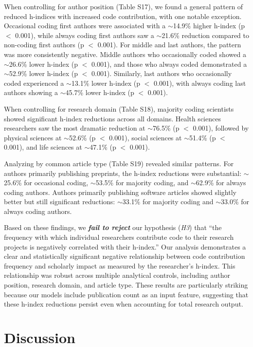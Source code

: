\documentclass[
  number,
  3p,
  onecolumn]{elsarticle}
\begin{document}
When controlling for author position (Table S17), we found a general
pattern of reduced h-indices with increased code contribution, with one
notable exception. Occasional coding first authors were associated with
a $\sim$14.9\% higher h-index (p $<$ 0.001), while
always coding first authors saw a $\sim$21.6\% reduction
compared to non-coding first authors (p $<$ 0.001). For middle
and last authors, the pattern was more consistently negative. Middle
authors who occasionally coded showed a $\sim$26.6\% lower
h-index (p $<$ 0.001), and those who always coded demonstrated a
$\sim$52.9\% lower h-index (p $<$ 0.001). Similarly,
last authors who occasionally coded experienced a $\sim$13.1\%
lower h-index (p $<$ 0.001), with always coding last authors
showing a $\sim$45.7\% lower h-index (p $<$ 0.001).

When controlling for research domain (Table S18), majority coding
scientists showed significant h-index reductions across all domains.
Health sciences researchers saw the most dramatic reduction at
$\sim$76.5\% (p $<$ 0.001), followed by physical
sciences at $\sim$52.6\% (p $<$ 0.001), social sciences
at $\sim$51.4\% (p $<$ 0.001), and life sciences at
$\sim$47.1\% (p $<$ 0.001).

Analyzing by common article type (Table S19) revealed similar patterns.
For authors primarily publishing preprints, the h-index reductions were
substantial: $\sim$25.6\% for occasional coding,
$\sim$53.5\% for majority coding, and $\sim$62.9\% for
always coding authors. Authors primarily publishing software articles
showed slightly better but still significant reductions:
$\sim$33.1\% for majority coding and $\sim$33.0\% for
always coding authors.

Based on these findings, we \textbf{\emph{fail to reject}} our
hypothesis (\emph{H3}) that ``the frequency with which individual
researchers contribute code to their research projects is negatively
correlated with their h-index.'' Our analysis demonstrates a clear and
statistically significant negative relationship between code
contribution frequency and scholarly impact as measured by the
researcher's h-index. This relationship was robust across multiple
analytical controls, including author position, research domain, and
article type. These results are particularly striking because our models
include publication count as an input feature, suggesting that these
h-index reductions persist even when accounting for total research
output.

\section{Discussion}\label{sec-discussion}
\end{document}
